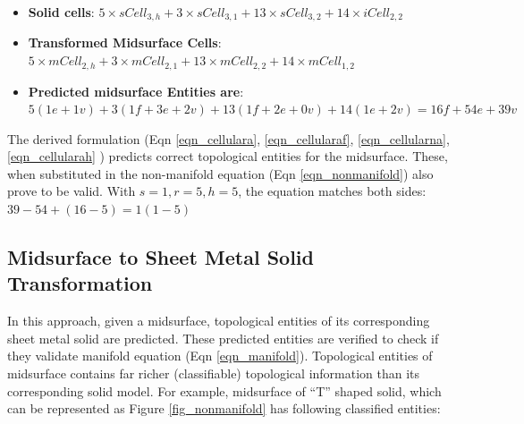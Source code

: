 \begin{itemize}
[noitemsep,topsep=2pt,parsep=2pt,partopsep=2pt,leftmargin=*]
	\item \textbf {Solid cells}: \newline  $5 \times sCell_{3,h} + 3 \times sCell_{3,1} + 13 \times sCell_{3,2} + 14 \times iCell_{2,2} $
	\item \textbf {Transformed Midsurface Cells}: \newline $5 \times mCell_{2,h} + 3 \times mCell_{2,1} + 13 \times mCell_{2,2} + 14 \times mCell_{1,2}$
	\item \textbf {Predicted midsurface Entities are}:  \newline $5(1e+1v) + 3 (1f+3e+2v) + 13 (1f+2e+0v) + 14(1e+2v) = 
16f + 54e + 39v$
\end{itemize}


The derived formulation (Eqn   \ref{eqn_cellulara}, \ref{eqn_cellularaf}, \ref{eqn_cellularna}, \ref{eqn_cellularah} ) predicts correct topological entities for the midsurface. These, when substituted in the non-manifold equation (Eqn \ref{eqn_nonmanifold}) also prove to be valid. With $s=1, r=5, h=5$, the equation matches both sides:
$ 39 - 54 + (16 -5) = 1 (1-5)$


\subsection{Midsurface to Sheet Metal Solid Transformation}
In this approach, given a midsurface, topological entities  of its corresponding sheet metal solid are predicted. These predicted entities are verified to check if they validate manifold equation (Eqn \ref{eqn_manifold}). Topological entities of midsurface contains far richer (classifiable) topological information than its corresponding solid model. For example, midsurface of ``T'' shaped solid, which can be represented as Figure \ref{fig_nonmanifold} has following classified entities:



